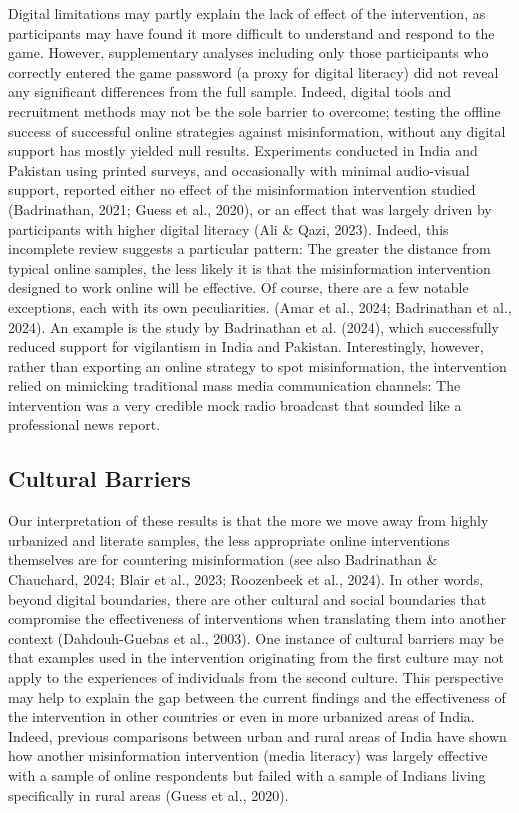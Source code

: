 \documentclass[authordate, empirical]{jote-new-article}
\begin{document}
	Digital limitations may partly explain the lack of effect of the intervention, as participants may have found it more difficult to understand and respond to the game. However, supplementary analyses including only those participants who correctly entered the game password (a proxy for digital literacy) did not reveal any significant differences from the full sample. Indeed, digital tools and recruitment methods may not be the sole barrier to overcome; testing the offline success of successful online strategies against misinformation, without any digital support has mostly yielded null results. Experiments conducted in India and Pakistan using printed surveys, and occasionally with minimal audio-visual support, reported either no effect of the misinformation intervention studied (Badrinathan, 2021; Guess et al., 2020), or an effect that was largely driven by participants with higher digital literacy (Ali \& Qazi, 2023). Indeed, this incomplete review suggests a particular pattern: The greater the distance from typical online samples, the less likely it is that the misinformation intervention designed to work online will be effective. Of course, there are a few notable exceptions, each with its own peculiarities. (Amar et al., 2024; Badrinathan et al., 2024). An example is the study by Badrinathan et al. (2024), which successfully reduced support for vigilantism in India and Pakistan. Interestingly, however, rather than exporting an online strategy to spot misinformation, the intervention relied on mimicking traditional mass media communication channels: The intervention was a very credible mock radio broadcast that sounded like a professional news report.



	\subsection{Cultural Barriers}



	 Our interpretation of these results is that the more we move away from highly urbanized and literate samples, the less appropriate online interventions themselves are for countering misinformation (see also Badrinathan \& Chauchard, 2024; Blair et al., 2023; Roozenbeek et al., 2024). In other words, beyond digital boundaries, there are other cultural and social boundaries that compromise the effectiveness of interventions when translating them into another context (Dahdouh-Guebas et al., 2003). One instance of cultural barriers may be that examples used in the intervention originating from the first culture may not apply to the experiences of individuals from the second culture. This perspective may help to explain the gap between the current findings and the effectiveness of the intervention in other countries or even in more urbanized areas of India. Indeed, previous comparisons between urban and rural areas of India have shown how another misinformation intervention (media literacy) was largely effective with a sample of online respondents but failed with a sample of Indians living specifically in rural areas (Guess et al., 2020).
\end{document}
